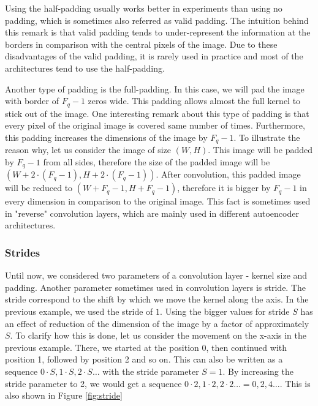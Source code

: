 Using the half-padding usually works better in experiments than using no padding, which is sometimes also referred as valid padding.
The intuition behind this remark is that valid padding tends to under-represent the information at the borders in comparison with the central pixels of the image.
Due to these disadvantages of the valid padding, it is rarely used in practice and most of the architectures tend to use the half-padding.

Another type of padding is the full-padding.
In this case, we will pad the image with border of $F_q - 1$ zeros wide.
This padding allows almost the full kernel to stick out of the image.
One interesting remark about this type of padding is that every pixel of the original image is covered same number of times.
Furthermore, this padding increases the dimensions of the image by $F_q - 1$.
To illustrate the reason why, let us consider the image of size $(W, H)$.
This image will be padded by $F_q - 1$ from all sides, therefore the size of the padded image will be $(W + 2\cdot(F_q - 1), H + 2\cdot(F_q - 1))$.
After convolution, this padded image will be reduced to $(W + F_q - 1, H + F_q - 1)$, therefore it is bigger by $F_q - 1$ in every dimension in comparison to the original image.
This fact is sometimes used in "reverse" convolution layers, which are mainly used in different autoencoder architectures.

\subsubsection{Strides}
Until now, we considered two parameters of a convolution layer - kernel size and padding.
Another parameter sometimes used in convolution layers is stride.
The stride correspond to the shift by which we move the kernel along the axis.
In the previous example, we used the stride of $1$.
Using the bigger values for stride $S$ has an effect of reduction of the dimension of the image by a factor of approximately $S$. 
To clarify how this is done, let us consider the movement on the x-axis in the previous example.
There, we started at the position 0, then continued with position 1, followed by position 2 and so on.
This can also be written as a sequence $0\cdot S, 1\cdot S, 2\cdot S\dots$ with the stride parameter $S = 1$.
By increasing the stride parameter to 2, we would get a sequence $0\cdot2, 1\cdot2, 2\cdot2\dots = 0, 2, 4\dots$.
This is also shown in Figure \ref{fig:stride}

